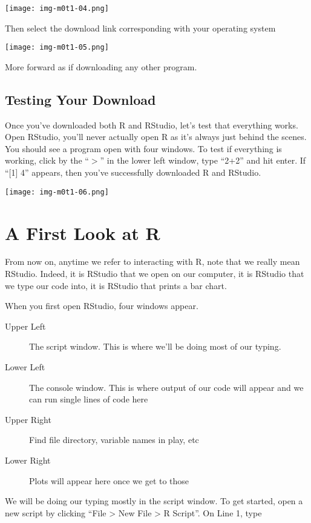 \documentclass[11pt]{amsart}
\renewcommand{\(}{\left(}
\renewcommand{\)}{\right)}
\begin{document}
\texttt{[image: img-m0t1-04.png]}

Then select the download link corresponding with your operating system

\texttt{[image: img-m0t1-05.png]}

More forward as if downloading any other program.

\subsection{Testing Your Download}

Once you've downloaded both R and RStudio, let's test that everything
works.  Open RStudio, you'll never actually open R as it's always just
behind the scenes.  You should see a program open with four windows.
To test if everything is working, click by the ``$>$'' in the lower
left window, type ``2+2'' and hit enter.  If ``[1] 4'' appears, then
you've successfully downloaded R and RStudio.

\texttt{[image: img-m0t1-06.png]}

\section{A First Look at R}
\label{sec:a-first-look}
  
From now on, anytime we refer to interacting with R, note that we
really mean RStudio.  Indeed, it is RStudio that we open on our
computer, it is RStudio that we type our code into, it is RStudio that
prints a bar chart.

When you first open RStudio, four windows appear.
\begin{description}
\item[Upper Left] The script window.  This is where we'll be doing
  most of our typing.
\item[Lower Left] The console window.  This is where output of our
  code will appear and we can run single lines of code here
\item[Upper Right] Find file directory, variable names in play, etc
\item[Lower Right] Plots will appear here once we get to those
\end{description}
  
We will be doing our typing mostly in the script window.  To get
started, open a new script by clicking ``File > New File > R Script''.  On Line 1, type
\end{document}
